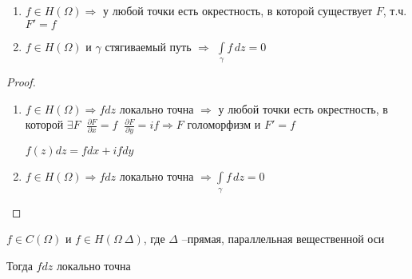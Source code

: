 
\begin{consequence}\thmslashn
	
	\begin{enumerate}
		\item 
		$f \in H(\Omega) \Rightarrow$ у любой точки есть окрестность, в которой существует $F$, т.ч. $F' = f$
		
		\item
		$f \in H(\Omega)$ и $\gamma$ стягиваемый путь $\Rightarrow$ $\int\limits_{\gamma} f\,dz = 0$
		
	\end{enumerate}
	
\end{consequence}

\begin{proof}\thmslashn
	
	\begin{enumerate}
		\item 
		$f \in H(\Omega) \Rightarrow fdz$ локально точна $\Rightarrow$ у любой точки есть окрестность, в которой $\exists F \;\; \frac{\partial F}{\partial x} = f \;\;\frac{\partial F}{\partial y} = if \Rightarrow F$ голоморфизм и $F' = f$
		
		$f(z)dz = fdx + ifdy$
		
		\item
		$f\in H(\Omega) \Rightarrow fdz$ локально точна  $\Rightarrow \int\limits_{\gamma} f\,dz = 0$ 
	\end{enumerate}
	
\end{proof}

\begin{theorem}\thmslashn
	
	$f\in C(\Omega)$ и $f \in H(\Omega \ \Delta)$, где $\Delta$ --прямая, параллельная вещественной оси
	
	Тогда $fdz$ локально точна
	
\end{theorem}

